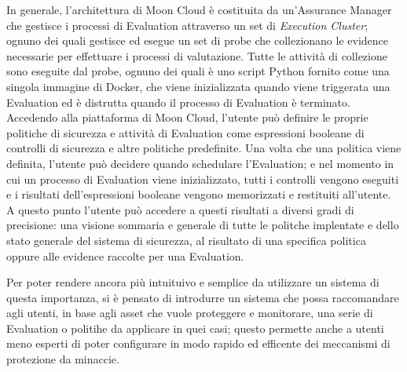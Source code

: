 In generale, l'architettura di Moon Cloud è costituita da un'Assurance Manager che gestisce i processi di Evaluation attraverso un set di 
\textit{Execution Cluster}; ognuno dei quali gestisce ed esegue un set di probe che collezionano le evidence necessarie per effettuare 
i processi di valutazione.
Tutte le attività di collezione sono eseguite dal probe, ognuno dei quali è uno script Python fornito come una singola immagine di Docker, 
che viene inizializzata quando viene triggerata una Evaluation ed è distrutta quando il processo di Evaluation è terminato.
\\
Accedendo alla piattaforma di Moon Cloud, l'utente può definire le proprie politiche di sicurezza e attività di Evaluation come 
espressioni booleane di controlli di sicurezza e altre politiche predefinite. Una volta che una politica viene definita, l'utente può 
decidere quando schedulare l'Evaluation; e nel momento in cui un processo di Evaluation viene inizializzato, tutti i controlli vengono 
eseguiti e i risultati dell'espressioni booleane vengono memorizzati e restituiti all'utente. A questo punto l'utente può accedere a 
questi risultati a diversi gradi di precisione: una visione sommaria e generale di tutte le politche implentate e dello stato generale 
del sistema di sicurezza, al risultato di una specifica politica oppure alle evidence raccolte per una Evaluation.

Per poter rendere ancora più intuituivo e semplice da utilizzare un sistema di questa importanza, si è pensato di introdurre un sistema
che possa raccomandare agli utenti, in base agli asset che vuole proteggere e monitorare, una serie di Evaluation o politihe da
applicare in quei casi; questo permette anche a utenti meno esperti di poter configurare in modo rapido ed efficente dei meccanismi di
protezione da minaccie.